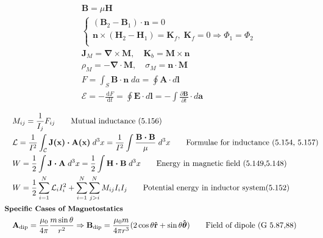 \documentclass[10pt]{article}
\newcommand{\rhat}{\boldsymbol{\hat{\textbf{r}}}}
\newcommand{\thetahat}{\boldsymbol{\hat{\textbf{$\theta$}}}}
\newcommand{\ve}[1]{\boldsymbol{\mathbf{#1}}}
\newcommand{\vect}[1]{\boldsymbol{\mathbf{#1}}}
\newcommand{\dd}{\, \mathrm{d}}
\newcommand{\tder}[2]{\frac{\dd #1}{\dd #2}}
\newcommand{\pder}[2]{\frac{\partial #1}{\partial #2}}
\begin{document}
\begin{multicols}{2}
\begin{align*}
		& \vect{B} = \mu \vect{H} \tag*{Property of linear permeable materials (5.84)} \\
		&\begin{cases}
			(\vect{B}_2 - \vect{B}_1) \cdot \vect{n} = 0 \\
			\vect{n} \times (\vect{H}_2 - \vect{H}_1) = \vect{K}_f, \; \ve{K}_f = 0 \Rightarrow \Phi_1 = \Phi_2 \\
		\end{cases} \tag*{Magnetic JC's (eval. at boundary) (5.86)} \\
		& \vect{J}_M = \vect{\nabla \times M}, \quad \vect{K}_b = \vect{M \times n}  \tag*{Bound current density (G. 6.13,14)} \\
		& \rho_M = - \vect{\nabla \cdot M}, \quad \sigma_M = \vect{n \cdot M} \tag*{Effective magnetic charge density (5.96,99)} \\
		& F = \int_S \vect{B \cdot n} \; da = \oint \ve{A} \cdot d \ve{l} \tag*{Magnetic flux (5.133)} \\
		& \mathscr{E} = -\tder{F}{t} = \oint \ve{E} \cdot d\ve{l} = -\int \pder{\ve{B}}{t} \cdot d \ve{a} \tag*{EMF due to Faraday's Law (5.135)} \\	
	\end{align*}
	\setlength{\abovedisplayskip}{-25pt}
	\setlength{\belowdisplayskip}{0pt}
	\setlength{\abovedisplayshortskip}{0pt}
	\setlength{\belowdisplayshortskip}{0pt}
	\begin{align*} 
		& M_{ij} = \frac{1}{I_j} F_{ij} \tag*{Mutual inductance (5.156)} \\
		& \mathcal{L} = \frac{1}{I^2} \int_\mathcal{C} \ve{J(x) \cdot A(x)} \; d^3 x = \frac{1}{I^2} \int \frac{\ve{B \cdot B}}{\mu} \; d^3 x \tag*{Formulae for inductance (5.154, 5.157)} \\
		& W = \frac{1}{2} \int \vect{J \cdot A} \; d^3 x  = \frac{1}{2} \int \vect{H \cdot B} \; d^3 x \tag*{Energy in magnetic field (5.149,5.148)} \\
		& W = \frac{1}{2} \sum_{i=1}^N \mathcal{L}_i I_i^2 + \sum_{i=1}^N \sum_{j>i}^N M_{ij} I_i I_j \tag*{Potential energy in inductor system(5.152)} \\
	& \small \hspace{-10pt} \textbf{Specific Cases of Magnetostatics} \small \\
		&\ve{A}_{\text{dip}} = \frac{\mu_0}{4 \pi} \frac{m \sin \theta}{r^2} \Rightarrow \ve{B}_{\text{dip}} = \frac{\mu_0 m}{4 \pi r^3}(2 \cos \theta \rhat + \sin \theta \thetahat) \tag*{Field of dipole (G 5.87,88)} \\

\end{align*}
\end{multicols}
\end{document}
